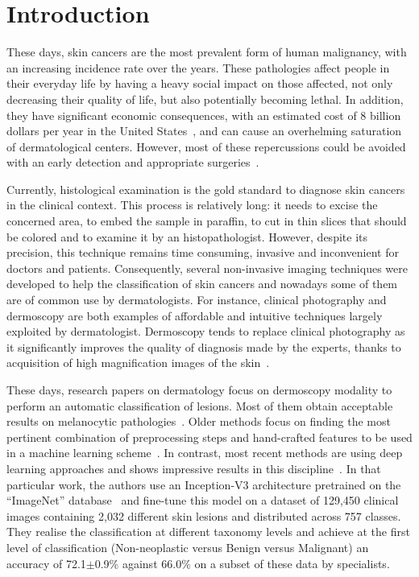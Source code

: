 \documentclass[journal,article,submit,moreauthors,pdftex, applsci]{Definitions/mdpi}
\begin{document}

\section{Introduction}
These days, skin cancers are the most prevalent form of human malignancy, with an increasing incidence rate over the years. These pathologies affect people in their everyday life by having a heavy social impact on those affected, not only decreasing their quality of life, but also potentially becoming lethal. In addition, they have significant economic consequences, with an estimated cost of 8 billion dollars per year in the United States~\cite{Farberg2017a}, and can cause an overhelming saturation of dermatological centers. However, most of these repercussions could be avoided with an early detection and appropriate surgeries~\cite{Farberg2017a}.\par
Currently, histological examination is the gold standard to diagnose skin cancers in the clinical context. This process is relatively long: it needs to excise the concerned area, to embed the sample in paraffin, to cut in thin slices that should be colored and to examine it by an histopathologist. However, despite its precision, this technique remains time consuming, invasive and inconvenient for doctors and patients. Consequently, several non-invasive imaging techniques were developed to help the classification of skin cancers and nowadays some of them are of common use by dermatologists. For instance, clinical photography and dermoscopy are both examples of affordable and intuitive techniques largely exploited by dermatologist. Dermoscopy tends to replace clinical photography as it significantly improves the quality of diagnosis made by the experts, thanks to acquisition of high magnification images of the skin~\cite{Sinz2017}.\par
These days, research papers on dermatology focus on dermoscopy modality to perform an automatic classification of lesions. Most of them obtain acceptable results on melanocytic pathologies~\cite{Iyatomi2010}. Older methods focus on finding the most pertinent combination of preprocessing steps and hand-crafted features to be used in a machine learning scheme~\cite{Rastgoo2015,Pathan2018}. In contrast, most recent methods are using deep learning approaches and shows impressive results in this discipline~\cite{Esteva2017}. In that particular work, the authors use an Inception-V3 architecture pretrained on the “ImageNet” database~\cite{Deng2008} and fine-tune this model on a dataset of 129,450 clinical images containing 2,032 different skin lesions and distributed across 757 classes. They realise the classification at different taxonomy levels and achieve at the first level of classification (Non-neoplastic versus Benign versus Malignant) an accuracy of 72.1$\pm$0.9\% against 66.0\% on a subset of these data by specialists.\par
\end{document}
